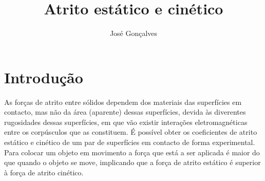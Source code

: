 \documentclass{article}
\title{Atrito estático e cinético}
\author{José Gonçalves}
\begin{document}
	\maketitle

\section*{Introdução}
	As forças de atrito entre sólidos dependem dos materiais das superfícies em contacto, mas não da área (aparente) dessas superfícies, devida às diverentes rugosidades dessas superfícies, em que vão existir interações eletromagnéticas entre os corpúsculos que as constituem. É possível obter os coeficientes de atrito estático e cinético de um par de superfícies em contacto de forma experimental.
	Para colocar um objeto em movimento a força que está a ser aplicada é maior do que quando o objeto se move, implicando que a força de atrito estático é superior à força de atrito cinético.
	
\end{document}
